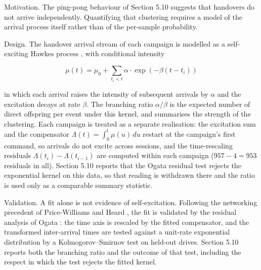 Motivation. The ping-pong behaviour of Section 5.10 suggests that handovers do not arrive independently. Quantifying that clustering requires a model of the arrival process itself rather than of the per-sample probability.

Design. The handover arrival stream of each campaign is modelled as a self-exciting Hawkes process \cite{ref23}, \cite{ref24} with conditional intensity


\begin{equation}\label{eq:4_13} \mu(t) = \mu_0 + \sum_{t_i < t} \alpha \cdot \exp( -\beta ( t - t_i ) ) \end{equation}

in which each arrival raises the intensity of subsequent arrivals by $\alpha$ and the excitation decays at rate $\beta$. The branching ratio $\alpha$/$\beta$ is the expected number of direct offspring per event under this kernel, and summarises the strength of the clustering. Each campaign is treated as a separate realisation: the excitation sum and the compensator $\Lambda(t) = \int_0^t \mu(u)\,du$ restart at the campaign's first command, so arrivals do not excite across sessions, and the time-rescaling residuals $\Lambda(t_i) - \Lambda(t_{i-1})$ are computed within each campaign ($957 - 4 = 953$ residuals in all). Section 5.10 reports that the Ogata residual test rejects the exponential kernel on this data, so that reading is withdrawn there and the ratio is used only as a comparable summary statistic.

Validation. A fit alone is not evidence of self-excitation. Following the networking precedent of Price-Williams and Heard \cite{ref26}, the fit is validated by the residual analysis of Ogata \cite{ref25}: the time axis is rescaled by the fitted compensator, and the transformed inter-arrival times are tested against a unit-rate exponential distribution by a Kolmogorov--Smirnov test on held-out drives. Section 5.10 reports both the branching ratio and the outcome of that test, including the respect in which the test rejects the fitted kernel.

